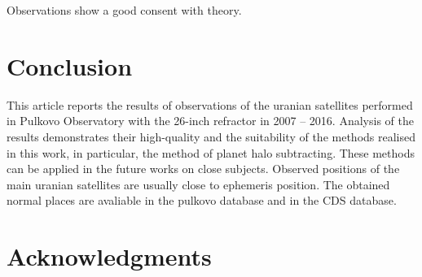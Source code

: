 \documentclass[]{article}
\begin{document}
\begin{figure}[h!]
\begin{minipage}[h]{0.49\linewidth}
\end{minipage}
\begin{minipage}[h]{0.49\linewidth}
\end{minipage}
\end{figure}

 Observations show a good consent with theory.\par

\section{Conclusion}
This article reports the results of observations of the uranian satellites performed in Pulkovo Observatory with the 26-inch refractor in 2007 -- 2016. Analysis of the results demonstrates their high-quality and the suitability of the methods realised in this work, in particular, the method of planet halo subtracting. These methods can be applied in the future works on close subjects. Observed positions of the main uranian satellites are usually close to ephemeris position. The obtained normal places are avaliable in the pulkovo database and in the CDS database.

\section{Acknowledgments}
\end{document}
